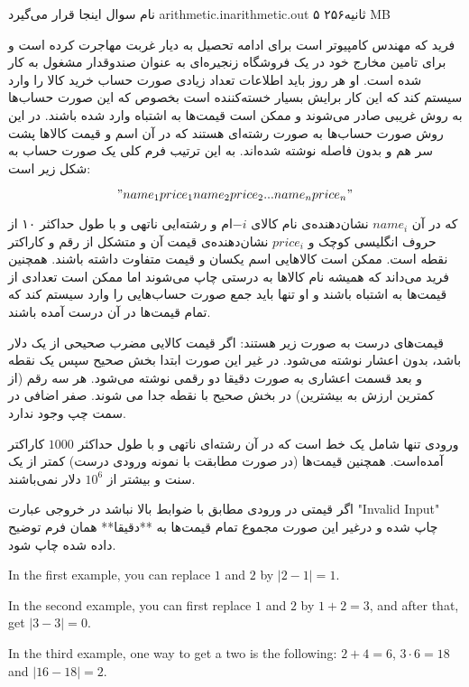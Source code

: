 \gdef\thisproblemauthor{نام صاحب اثر اینجا قرار می‌گیرد}
\gdef\thisproblemdeveloper{نام توسعه‌دهنده اینجا قرار می‌گیرد}
\gdef\thisproblemorigin{\texttt{XXXIII} نام منبع اینجا قرار می‌گیرد}
\begin{problem}{نام سوال اینجا قرار می‌گیرد}
{arithmetic.in}{arithmetic.out}
{۵ ثانیه}{۲۵۶ MB}{}

    فرید که مهندس کامپیوتر است برای ادامه تحصیل به دیار غربت مهاجرت کرده است و برای تامین مخارج خود در یک فروشگاه زنجیره‌ای به عنوان صندوقدار مشغول به کار شده است. او هر روز باید اطلاعات تعداد زیادی صورت حساب‌ خرید کالا را وارد سیستم کند که این کار برایش بسیار خسته‌کننده است بخصوص که این صورت حساب‌ها به روش غریبی صادر می‌شوند و ممکن است قیمت‌ها به اشتباه وارد شده باشند. در این روش صورت‌ حساب‌ها به صورت رشته‌ای هستند که در آن اسم و قیمت کالاها پشت سر هم و بدون فاصله نوشته شده‌‌اند. به این ترتیب فرم کلی یک صورت حساب به شکل زیر است:

    $$"name_1price_1name_2price_2...name_nprice_n"$$

    که در آن $name_i$ نشان‌دهنده‌ی نام کالای ‌$-i$ام و رشته‌ایی ناتهی و با طول حداکثر ۱۰ از حروف انگلیسی کوچک و $price_i$ نشان‌دهنده‌ی قیمت آن و متشکل از رقم و کاراکتر نقطه است.
    ممکن است کالاهایی اسم یکسان و قیمت متفاوت داشته باشند. همچنین فرید می‌داند که همیشه نام کالاها به درستی چاپ می‌شوند اما ممکن است تعدادی از قیمت‌ها به اشتباه باشند و او تنها باید جمع صورت حساب‌هایی را وارد سیستم کند که تمام قیمت‌ها در آن درست آمده باشند.

    قیمت‌های درست به صورت زیر هستند:
    اگر قیمت کالایی مضرب صحیحی از یک دلار باشد، بدون اعشار نوشته می‌شود. در غیر این صورت ابتدا بخش صحیح سپس یک نقطه و بعد قسمت اعشاری به صورت دقیقا دو رقمی نوشته می‌شود.
    هر سه رقم (از کمترین ارزش به بیشترین) در بخش صحیح با نقطه جدا می شوند.
    صفر اضافی در سمت چپ وجود ندارد.
    \InputFile

    ورودی تنها شامل یک خط است که در آن رشته‌ای ناتهی و با طول حداکثر $1000$ کاراکتر آمده‌است. همچنین قیمت‌ها (در صورت مطابقت با نمونه ورودی درست) کمتر از یک سنت و بیشتر از $10^6$ دلار نمی‌باشند.
    \OutputFile

    اگر قیمتی در ورودی مطابق با ضوابط بالا نباشد در خروجی عبارت "‌Invalid Input" چاپ شده و درغیر این صورت مجموع تمام قیمت‌ها به **دقیقا** همان فرم توضیح داده ‌شده چاپ شود.


    \Examples

    \begin{example}
    \end{example}

    \Explanations

    In the first example, you can replace $1$ and $2$ by $|2 - 1| = 1$.

    In the second example, you can first replace $1$ and $2$ by $1 + 2 = 3$,
    and after that, get $|3 - 3| = 0$.

    In the third example, one way to get a two is the following:
    $2 + 4 = 6$, $3 \cdot 6 = 18$ and $|16 - 18| = 2$.

\end{problem}
